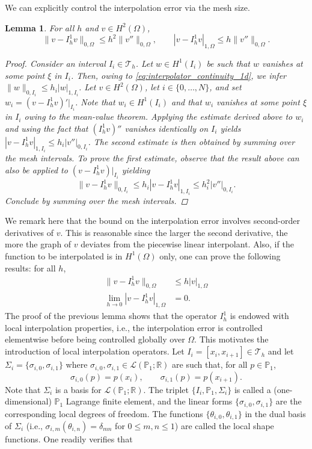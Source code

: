 \documentclass{article}
\newtheorem{lemma}{Lemma}
\begin{document}
We can explicitly control the interpolation error via the mesh size.
\begin{lemma}
    For all $h$ and $v \in H^2(\Omega)$,
    $$ \|v - I_h^1 v\|_{0,\Omega} \le h^2 \|v''\|_{0,\Omega},\qquad  |v - I_h^1 v|_{1,\Omega} \le h \|v''\|_{0,\Omega}. $$
\begin{proof}
    Consider an interval $I_i \in \mathcal{T}_h$. Let $w \in H^1(I_i)$ be such that $w$ vanishes at some point $\xi$ in $I_i$. Then, owing to \eqref{eq:interpolator_continuity_1d}, we infer $\|w\|_{0,I_i} \le h_i |w|_{1,I_i}$.
    Let $v \in H^2(\Omega)$, let $i \in \{0, \dots, N\}$, and set $w_i = (v - I_h^1 v)'|_{I_i}$. Note that $w_i \in H^1(I_i)$ and that $w_i$ vanishes at some point $\xi$ in $I_i$ owing to the mean-value theorem. Applying the estimate derived above to $w_i$ and using the fact that $(I_h^1 v)''$ vanishes identically on $I_i$ yields $|v - I_h^1 v|_{1,I_i} \le h_i |v''|_{0,I_i}$. The second estimate is then obtained by summing over the mesh intervals. To prove the first estimate, observe that the result above can also be applied to $(v - I_h^1 v)|_{I_i}$ yielding
    $$ \|v - I_h^1 v\|_{0,I_i} \le h_i |v - I_h^1 v|_{1,I_i} \le h_i^2 |v''|_{0,I_i}. $$
    Conclude by summing over the mesh intervals.
\end{proof}
\end{lemma}
We remark here that the bound on the interpolation error involves second-order derivatives of $v$. This is reasonable since the larger the second derivative, the more the graph of $v$ deviates from the piecewise linear interpolant. Also, if the function to be interpolated is in $H^1(\Omega)$ only, one can prove the following results: for all $h$,
\begin{align*}
    \|v - I_h^1 v\|_{0,\Omega} &\le h |v|_{1,\Omega}\\
    \lim_{h \rightarrow 0} |v - I_h^1 v|_{1,\Omega} &= 0.
\end{align*}
The proof of the previous lemma shows that the operator $I_h^1$ is endowed with local interpolation properties, i.e., the interpolation error is controlled elementwise before being controlled globally over $\Omega$. This motivates the introduction of local interpolation operators. Let $I_i = [x_i, x_{i+1}] \in \mathcal{T}_h$ and let $\Sigma_i = \{\sigma_{i,0}, \sigma_{i,1}\}$ where $\sigma_{i,0}, \sigma_{i,1} \in \mathcal{L}(\mathbb{P}_1; \mathbb{R})$ are such that, for all $p \in \mathbb{P}_1$,
$$ \sigma_{i,0}(p) = p(x_i),\qquad \sigma_{i,1}(p) = p(x_{i+1}). $$
Note that $\Sigma_i$ is a basis for $\mathcal{L}(\mathbb{P}_1; \mathbb{R})$. The triplet $\{I_i, \mathbb{P}_1, \Sigma_i\}$ is called a (one-dimensional) $\mathbb{P}_1$ Lagrange finite element, and the linear forms $\{\sigma_{i,0}, \sigma_{i,1}\}$ are the corresponding local degrees of freedom. The functions $\{\theta_{i,0}, \theta_{i,1}\}$ in the dual basis of $\Sigma_i$ (i.e., $\sigma_{i,m}(\theta_{i,n}) = \delta_{mn}$ for $0 \le m, n \le 1$) are called the local shape functions. One readily verifies that
\end{document}
